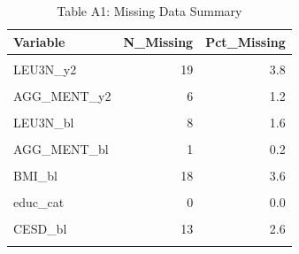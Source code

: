 \begin{table}[!h]
\centering
\caption{\label{tab:miss-table-appendix}Table A1: Missing Data Summary}
\centering
\begin{tabular}[t]{lrr}
\toprule
Variable & N\_Missing & Pct\_Missing\\
\midrule
\cellcolor{gray!10}{log10VLOAD\_y2} & \cellcolor{gray!10}{19} & \cellcolor{gray!10}{3.8}\\
LEU3N\_y2 & 19 & 3.8\\
\cellcolor{gray!10}{AGG\_PHYS\_y2} & \cellcolor{gray!10}{6} & \cellcolor{gray!10}{1.2}\\
AGG\_MENT\_y2 & 6 & 1.2\\
\cellcolor{gray!10}{log10VLOAD\_bl} & \cellcolor{gray!10}{9} & \cellcolor{gray!10}{1.8}\\
\addlinespace
LEU3N\_bl & 8 & 1.6\\
\cellcolor{gray!10}{AGG\_PHYS\_bl} & \cellcolor{gray!10}{1} & \cellcolor{gray!10}{0.2}\\
AGG\_MENT\_bl & 1 & 0.2\\
\cellcolor{gray!10}{age\_bl} & \cellcolor{gray!10}{0} & \cellcolor{gray!10}{0.0}\\
BMI\_bl & 18 & 3.6\\
\addlinespace
\cellcolor{gray!10}{race\_cat} & \cellcolor{gray!10}{0} & \cellcolor{gray!10}{0.0}\\
educ\_cat & 0 & 0.0\\
\cellcolor{gray!10}{smoke\_cat} & \cellcolor{gray!10}{0} & \cellcolor{gray!10}{0.0}\\
CESD\_bl & 13 & 2.6\\
\cellcolor{gray!10}{ADH\_y2} & \cellcolor{gray!10}{0} & \cellcolor{gray!10}{0.0}\\
\bottomrule
\end{tabular}
\end{table}
